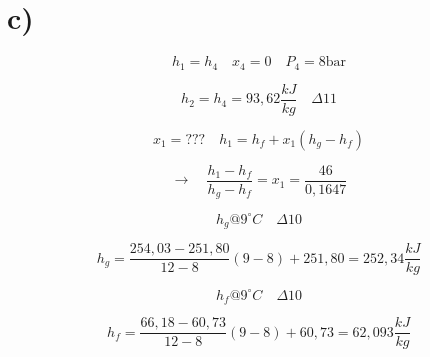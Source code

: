 

\section*{c)}

\[
h_1 = h_4 \quad x_4 = 0 \quad P_4 = 8 \text{bar}
\]

\[
h_2 = h_4 = 93,62 \frac{kJ}{kg} \quad \Delta 11
\]

\[
x_1 = ??? \quad h_1 = h_f + x_1 (h_g - h_f)
\]

\[
\rightarrow \quad \frac{h_1 - h_f}{h_g - h_f} = x_1 = \frac{46}{0,1647}
\]

\[
h_g @ 9^\circ C \quad \Delta 10
\]

\[
h_g = \frac{254,03 - 251,80}{12 - 8} (9 - 8) + 251,80 = 252,34 \frac{kJ}{kg}
\]

\[
h_f @ 9^\circ C \quad \Delta 10
\]

\[
h_f = \frac{66,18 - 60,73}{12 - 8} (9 - 8) + 60,73 = 62,093 \frac{kJ}{kg}
\]